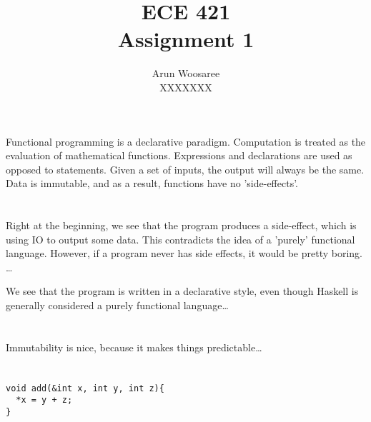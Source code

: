 \documentclass[letterpaper]{article}
\title{ECE 421 \\
Assignment 1}
\author{Arun Woosaree\\
  XXXXXXX}
\begin{document}
\maketitle %

\section{}
Functional programming is a declarative paradigm.
Computation is treated as the evaluation of mathematical functions.
Expressions and declarations are used as opposed to statements.
Given a set of inputs, the output will always be the same.
Data is immutable, and as a result,
functions have no 'side-effects'.

\section{}

Right at the beginning, we see that the program produces a side-effect, which
is using IO to output some data. This contradicts the idea of a 'purely'
functional language. However, if a program never has side effects, it would be
pretty boring. \dots {}

We see that the program is written in a declarative style, even though Haskell
is generally considered a purely functional language\dots


\section{}
Immutability is nice, because it makes things predictable\dots

\section{}
\begin{verbatim}
void add(&int x, int y, int z){
  *x = y + z;
}
\end{verbatim}
%
\end{document}
